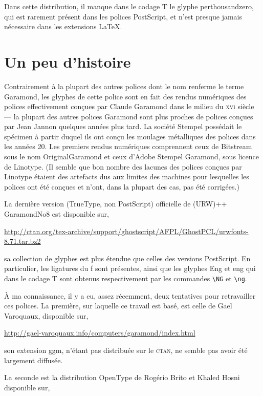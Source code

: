 \documentclass[12pt,english,french]{article}
\newcommand{\mnu}[1]{\textsf{#1}}
\begin{document}
Dans cette distribution, il manque dans le codage T le glyphe \mnu{perthousandzero}, qui est rarement présent dans les polices PostScript, et n'est presque jamais nécessaire dans les extensions \LaTeX.

\section{Un peu d'histoire}

Contrairement à la plupart des autres polices dont le nom renferme le terme Garamond, les glyphes de cette police sont en fait des rendus numériques des polices effectivement conçues par Claude Garamond dans le milieu du \textsc{xvi} siècle --- la plupart des autres polices Garamond sont plus proches de polices conçues par Jean Jannon quelques années plus tard. La société Stempel possédait le spécimen à partir duquel ils ont conçu les moulages métalliques des polices dans les années 20. Les premiers rendus numériques comprennent ceux de Bitstream sous le nom OriginalGaramond et ceux d'Adobe Stempel Garamond, sous licence de Linotype. (Il semble que bon nombre des lacunes des polices conçues par Linotype étaient des artefacts dus aux limites des machines pour lesquelles les polices ont été conçues et n'ont, dans la plupart des cas, pas été corrigées.)

La dernière version (TrueType, non PostScript) officielle de (URW)++ GaramondNo8 est disponible sur,

\noindent\url{http://ctan.org/tex-archive/support/ghostscript/AFPL/GhostPCL/urwfonts-8.71.tar.bz2}

\noindent sa collection de glyphes est plus étendue que celles des versions PostScript. En particulier, les ligatures du f sont présentes, ainsi que les glyphes \mnu{Eng} et \mnu{eng} qui dans le codage T sont obtenus respectivement par les commandes \verb+\NG+ et \verb+\ng+.

À ma connaissance, il y a eu, assez récemment, deux tentatives pour retravailler ces polices. La première, sur laquelle ce travail est basé, est celle de Gael Varoquaux, disponible sur,

\noindent\url{http://gael-varoquaux.info/computers/garamond/index.html}

\noindent son extension \mnu{ggm}, n'étant pas distribuée sur le \textsc{ctan}, ne semble pas avoir été largement diffusée.

La seconde est la distribution OpenType de Rogério Brito et Khaled Hosni disponible sur, 
\end{document}
